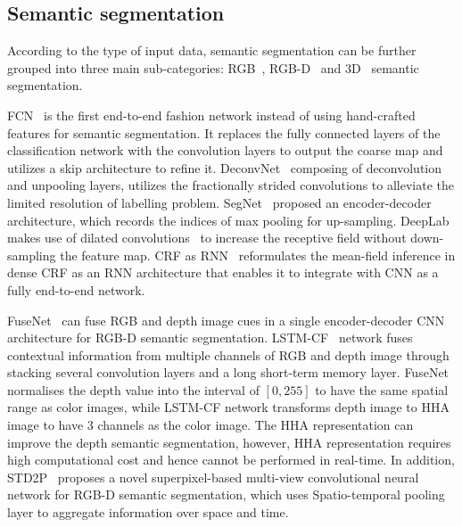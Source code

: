 \documentclass[letterpaper, 10 pt, conference]{ieeeconf}
\begin{document}
\subsection{Semantic segmentation}\label{sec:2.2}
According to the type of input data, semantic segmentation can be further grouped into three main sub-categories: RGB~\cite{long2015fully}\cite{badrinarayanan2015segnet}\cite{chen2016deeplab}\cite{zheng2015conditional}\cite{noh2015learning}, RGB-D~\cite{hazirbas2016fusenet}\cite{li2016lstm}\cite{he2017std2p} and 3D~\cite{qi2016pointnet}\cite{qi2017pointnet++} semantic segmentation.

FCN~\cite{long2015fully} is the first end-to-end fashion network instead of using hand-crafted features for semantic segmentation. It replaces the fully connected layers of the classification network with the convolution layers to output the coarse map and utilizes a skip architecture to refine it. DeconvNet~\cite{noh2015learning} composing of deconvolution and unpooling layers, utilizes the fractionally strided convolutions to alleviate the limited resolution of labelling problem. SegNet~\cite{badrinarayanan2015segnet} proposed an encoder-decoder architecture, which records the indices of max pooling for up-sampling. DeepLab~\cite{chen2016deeplab} makes use of dilated convolutions~\cite{yu2015multi} to increase the receptive field without down-sampling the feature map. CRF as RNN~\cite{zheng2015conditional} reformulates the mean-field inference in dense CRF as an RNN architecture that enables it to integrate with CNN as a fully end-to-end network.        

FuseNet~\cite{hazirbas2016fusenet} can fuse RGB and depth image cues in a single encoder-decoder CNN architecture for RGB-D semantic segmentation. LSTM-CF~\cite{li2016lstm} network fuses contextual information from multiple channels of RGB and depth image through stacking several convolution layers and a long short-term memory layer. FuseNet normalises the depth value into the interval of $[0, 255]$ to have the same spatial range as color images, while LSTM-CF network transforms depth image to HHA image to have 3 channels as the color image.  The HHA representation can improve the depth semantic segmentation, however, HHA representation requires high computational cost and hence cannot be performed in real-time. In addition, STD2P~\cite{he2017std2p} proposes a novel superpixel-based multi-view convolutional neural network for RGB-D semantic segmentation, which uses Spatio-temporal pooling layer to aggregate information over space and time.    
\end{document}
